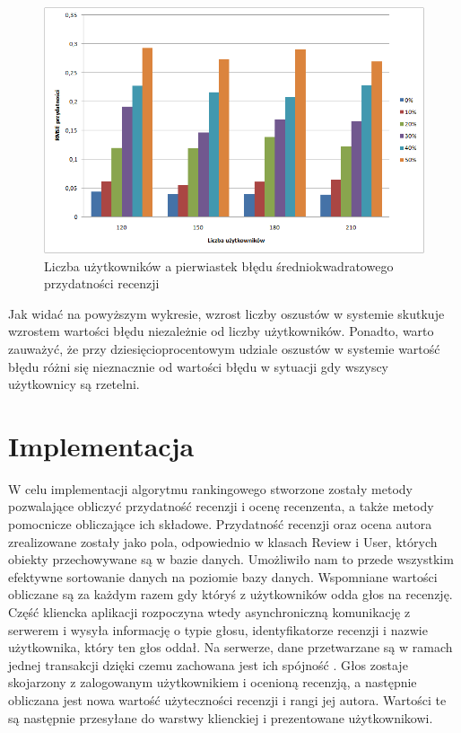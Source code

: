 \begin{figure}[h]
	\centering
	\includegraphics[scale=0.7]{images/LiarsTest.png}
	\caption{Liczba użytkowników a pierwiastek błędu średniokwadratowego przydatności recenzji}
\end{figure}

Jak widać na powyższym wykresie, wzrost liczby oszustów w systemie skutkuje wzrostem wartości błędu niezależnie od liczby użytkowników. Ponadto, warto zauważyć, że przy dziesięcioprocentowym udziale oszustów w systemie wartość błędu różni się nieznacznie od wartości błędu w sytuacji gdy wszyscy użytkownicy są rzetelni.

\section{Implementacja}

W celu implementacji algorytmu rankingowego stworzone zostały metody pozwalające obliczyć przydatność recenzji i ocenę recenzenta, a także metody pomocnicze obliczające ich składowe. Przydatność recenzji oraz ocena autora zrealizowane zostały jako pola, odpowiednio w klasach Review i User, których obiekty przechowywane są w bazie danych. Umożliwiło nam to przede wszystkim efektywne sortowanie danych na poziomie bazy danych. Wspomniane wartości obliczane są za każdym razem gdy któryś z użytkowników odda głos na recenzję. Część kliencka aplikacji rozpoczyna wtedy asynchroniczną komunikację z serwerem i wysyła informację o typie głosu, identyfikatorze recenzji i nazwie użytkownika, który ten  głos oddał. Na serwerze, dane przetwarzane są w ramach jednej transakcji dzięki czemu zachowana jest ich spójność \cite{springAction}. Głos zostaje skojarzony z zalogowanym użytkownikiem i ocenioną recenzją, a następnie obliczana jest nowa wartość użyteczności recenzji i rangi jej autora. Wartości te są następnie przesyłane do warstwy klienckiej i  prezentowane użytkownikowi.

